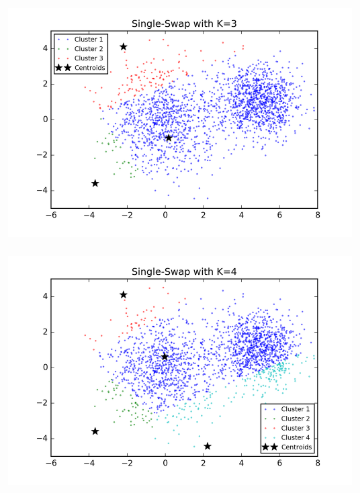 \begin{figure}[htb]
        \centering
        \begin{subfigure}[b]{0.475\textwidth}
            \centering
            \includegraphics[width=\textwidth]{./figures/clustering_singleSwap_3.png}
        \end{subfigure}
        \hfill
        \begin{subfigure}[b]{0.475\textwidth}  
            \centering 
            \includegraphics[width=\textwidth]{./figures/clustering_singleSwap_4.png}
        \end{subfigure}
        \begin{subfigure}[b]{0.475\textwidth}  
            \centering 

\end{subfigure}
\end{figure}
